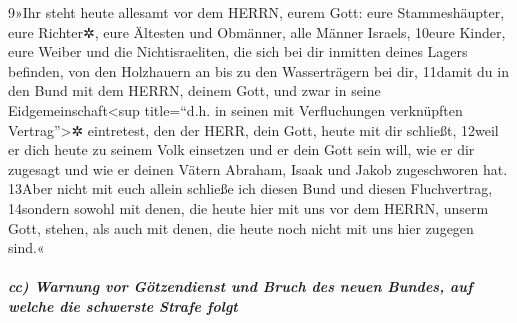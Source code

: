 9»Ihr steht heute allesamt vor dem HERRN, eurem Gott: eure
Stammeshäupter, eure Richter✲, eure Ältesten und Obmänner, alle Männer
Israels, 10eure Kinder, eure Weiber und die Nichtisraeliten, die sich
bei dir inmitten deines Lagers befinden, von den Holzhauern an bis zu
den Wasserträgern bei dir, 11damit du in den Bund mit dem HERRN, deinem
Gott, und zwar in seine Eidgemeinschaft\textless sup title=``d.h. in
seinen mit Verfluchungen verknüpften Vertrag''\textgreater✲ eintretest,
den der HERR, dein Gott, heute mit dir schließt, 12weil er dich heute zu
seinem Volk einsetzen und er dein Gott sein will, wie er dir zugesagt
und wie er deinen Vätern Abraham, Isaak und Jakob zugeschworen hat.
13Aber nicht mit euch allein schließe ich diesen Bund und diesen
Fluchvertrag, 14sondern sowohl mit denen, die heute hier mit uns vor dem
HERRN, unserm Gott, stehen, als auch mit denen, die heute noch nicht mit
uns hier zugegen sind.«

\hypertarget{cc-warnung-vor-guxf6tzendienst-und-bruch-des-neuen-bundes-auf-welche-die-schwerste-strafe-folgt}{%
\subparagraph{cc) Warnung vor Götzendienst und Bruch des neuen Bundes,
auf welche die schwerste Strafe
folgt}\label{cc-warnung-vor-guxf6tzendienst-und-bruch-des-neuen-bundes-auf-welche-die-schwerste-strafe-folgt}}

